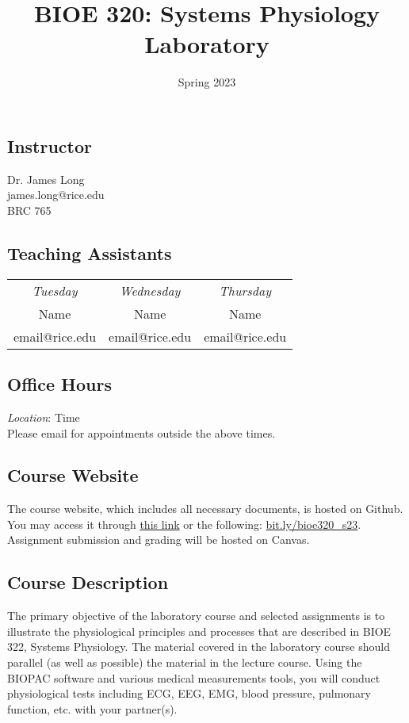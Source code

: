 \documentclass{article}
\title{BIOE 320: Systems Physiology Laboratory}
\author{Spring 2023}
\date{}
\begin{document}
\maketitle
\subsection*{Instructor}
Dr. James Long\\
james.long@rice.edu\\
BRC 765

\subsection*{Teaching Assistants}
\begin{table}[h!]
	\centering
\begin{tabular}[h!]{ccc}
\textit{Tuesday} & \textit{Wednesday} & \textit{Thursday}\\
Name & Name & Name\\
email@rice.edu & email@rice.edu & email@rice.edu
\end{tabular}
\end{table}

\subsection*{Office Hours}
\textit{Location}: Time\\
Please email for appointments outside the above times.

\subsection*{Course Website}
The course website, which includes all necessary documents, is hosted on Github. You may access it through \href{https://jameslong12.github.io/BIOE320}{this link} or the following: \href{https://bit.ly/bioe320_s23}{bit.ly/bioe320\_s23}. Assignment submission and grading will be hosted on Canvas.

\subsection*{Course Description}
The primary objective of the laboratory course and selected assignments is to illustrate the physiological principles and processes that are described in BIOE 322, Systems Physiology. The material covered in the laboratory course should parallel (as well as possible) the material in the lecture course. Using the BIOPAC software and various medical measurements tools, you will conduct physiological tests including ECG, EEG, EMG, blood pressure, pulmonary function, etc. with your partner(s).
\end{document}
